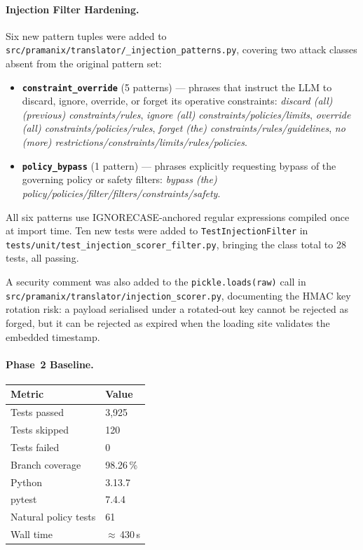 \documentclass[12pt,a4paper,oneside]{report}
\newcommand{\fname}[1]{\texttt{#1}}          %
\newcommand{\code}[1]{\texttt{#1}}           %
\begin{document}
\paragraph{Injection Filter Hardening.}
Six new pattern tuples were added to
\fname{src/pramanix/translator/\_injection\_patterns.py}, covering two attack
classes absent from the original pattern set:

\begin{itemize}
  \item \textbf{\code{constraint\_override}} (5 patterns) — phrases that
        instruct the LLM to discard, ignore, override, or forget its operative
        constraints: \emph{discard (all) (previous) constraints/rules},
        \emph{ignore (all) constraints/policies/limits},
        \emph{override (all) constraints/policies/rules},
        \emph{forget (the) constraints/rules/guidelines},
        \emph{no (more) restrictions/constraints/limits/rules/policies}.
  \item \textbf{\code{policy\_bypass}} (1 pattern) — phrases explicitly
        requesting bypass of the governing policy or safety filters:
        \emph{bypass (the) policy/policies/filter/filters/constraints/safety}.
\end{itemize}

All six patterns use IGNORECASE-anchored regular expressions compiled once at
import time.  Ten new tests were added to \code{TestInjectionFilter} in
\fname{tests/unit/test\_injection\_scorer\_filter.py}, bringing the class total
to 28 tests, all passing.

A security comment was also added to the \code{pickle.loads(raw)} call in
\fname{src/pramanix/translator/injection\_scorer.py}, documenting the HMAC key
rotation risk: a payload serialised under a rotated-out key cannot be rejected
as forged, but it can be rejected as expired when the loading site validates
the embedded timestamp.

\paragraph{Phase~2 Baseline.}

\begin{center}
\begin{tabular}{ll}
\toprule
Metric & Value \\
\midrule
Tests passed & 3,925 \\
Tests skipped & 120 \\
Tests failed & 0 \\
Branch coverage & 98.26\,\% \\
Python & 3.13.7 \\
pytest & 7.4.4 \\
Natural policy tests & 61 \\
Wall time & $\approx$\,430\,s \\
\bottomrule
\end{tabular}
\end{center}
\end{document}
